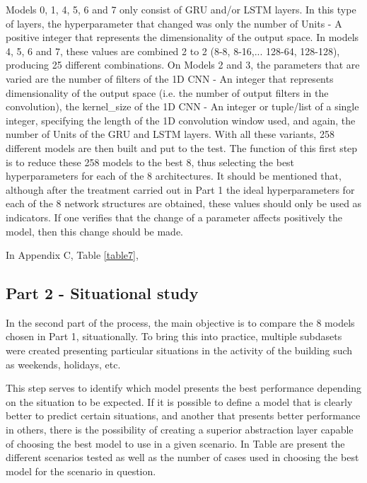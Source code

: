 Models 0, 1, 4, 5, 6 and 7 only consist of \ac{GRU} and/or \ac{LSTM} layers. In this type of layers, the hyperparameter that changed was only the number of Units - A positive integer that represents the dimensionality of the output space. In models 4, 5, 6 and 7, these values are combined 2 to 2 (8-8, 8-16,... 128-64, 128-128), producing 25 different combinations. On Models 2 and 3, the parameters that are varied are the number of filters of the \ac{1D CNN} - An integer that represents dimensionality of the output space (i.e. the number of output filters in the convolution), the kernel\_size of the \ac{1D CNN} - An integer or tuple/list of a single integer, specifying the length of the 1D convolution window used, and again, the number of Units of the \ac{GRU} and \ac{LSTM} layers. With all these variants, 258 different models are then built and put to the test. The function of this first step is to reduce these 258 models to the best 8, thus selecting the best hyperparameters for each of the 8 architectures. It should be mentioned that, although after the treatment carried out in Part 1 the ideal hyperparameters for each of the 8 network structures are obtained, these values should only be used as indicators. If one verifies that the change of a parameter affects positively the model, then this change should be made.


In Appendix C, Table \ref{table7}, 













\subsection{Part 2 - Situational study}

In the second part of the process, the main objective is to compare the 8 models chosen in Part 1, situationally. To bring this into practice, multiple subdasets were created presenting particular situations in the activity of the building such as weekends, holidays, etc.

This step serves to identify which model presents the best performance depending on the situation to be expected. If it is possible to define a model that is clearly better to predict certain situations, and another that presents better performance in others, there is the possibility of creating a superior abstraction layer capable of choosing the best model to use in a given scenario. In Table {} are present the different scenarios tested as well as the number of cases used in choosing the best model for the scenario in question.

